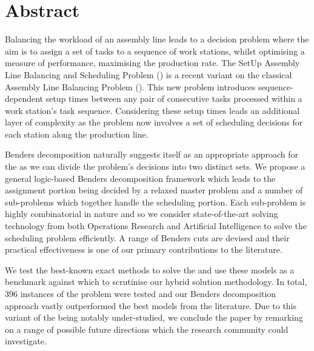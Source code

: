 \chapter{Abstract}

Balancing the workload of an assembly line
leads to a decision problem where the aim is to
assign a set of tasks to a sequence of work stations,
whilst optimising a measure of performance, \eg maximising the production
rate.
The SetUp Assembly Line Balancing and Scheduling Problem (\sua{})
is a recent variant on the classical Assembly Line Balancing Problem (\albp{}).
This new problem introduces sequence-dependent
setup times between any pair of consecutive tasks
processed within a work station's task sequence.
Considering these setup times leads an additional layer
of complexity as the problem now involves a set
of scheduling decisions for each station along the production line.

Benders decomposition naturally suggests itself as an appropriate
approach for the \sua{} as we can divide the problem's decisions
into two distinct sets.
We propose a general logic-based Benders decomposition framework which 
leads to the assignment portion being decided by a relaxed
master problem and a number of sub-problems which together
handle the scheduling portion.
Each sub-problem is highly combinatorial in nature and so
we consider state-of-the-art solving technology from
both Operations Research and Artificial Intelligence
to solve the scheduling problem efficiently.
A range of Benders cuts are devised 
and their practical effectiveness
is one of our primary contributions to the 
literature.

We test the best-known exact methods to solve
the \sua{} and use these models
as a benchmark against which to scrutinise our hybrid solution methodology.
In total, 396 instances of the problem were tested and our Benders
decomposition approach vastly outperformed the best models from the literature.
Due to this variant of the \albp{} being notably under-studied,
we conclude the paper by remarking on a range of possible future directions
which the research community could investigate.
